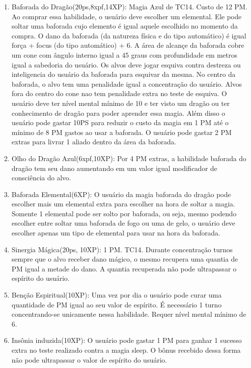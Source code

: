 \begin{enumerate}
	\item Baforada do Dragão(20ps,8xpf,14XP): Magia Azul de TC14. Custo de 12 PM.\newline
	Ao comprar essa habilidade, o usuário deve escolher um elemental. Ele pode soltar uma baforada cujo elemento é igual aquele escolhido no momento da compra. O dano da baforada (da natureza física e do tipo automático) é igual força + focus (do tipo automático) + 6. A área de alcançe da baforada cobre um cone com ângulo interno igual a 45 graus com profundidade em metros igual a sabedoria do usuário. 
	Os alvos deve jogar esquiva contra destreza ou inteligencia do usuário da baforada para esquivar da mesma.
	No centro da baforada, o alvo tem uma penalidade igual a concentração do usuário. Alvos fora do centro do cone nao tem penalidade extra no teste de esquiva. 
	O usuário deve ter nível mental mínimo de 10 e ter visto um dragão ou ter conhecimento de dragão para poder aprender essa magia. Além disso o usuário pode gastar 10PS para reduzir o custo da magia em 1 PM até o mínimo de 8 PM gastos ao usar a baforada. O usuário pode gastar 2 PM extras para livrar 1 aliado dentro da área da baforada.
	
	\item Olho do Dragão Azul(6xpf,10XP): Por 4 PM extras, a habilidade baforada do dragão tem seu dano aumentando em um valor igual modificador de consciência do alvo.
	
	\item Baforada Elemental(6XP): O usuário da magia baforada do dragão pode escolher mais um elemental extra para escolher na hora de soltar a magia. Somente 1 elemental pode ser solto por baforada, ou seja, mesmo podendo escolher entre soltar uma baforada de fogo ou uma de gelo, o usuário deve escolher apenas um tipo de elemental para usar na hora da baforada.

	\item Sinergia Mágica(20ps, 10XP): 1 PM. TC14. \newline
Durante concentração turnos sempre que o alvo receber dano mágico, o mesmo recupera uma quantia de PM igual a metade do dano. A quantia recuperada não pode ultrapassar o espírito do usuário.

	\item Benção Espiritual(10XP): Uma vez por dia o usuário pode curar uma quantidade de PM igual ao seu valor de espírito. É necessário 1 turno concentrando-se unicamente nessa habilidade. Requer nível mental mínimo de 6.

	\item Insônia induzida(10XP): O usuário pode gastar 1 PM para ganhar 1 sucesso extra no teste realizado contra a magia sleep. O bônus recebido dessa forma não pode ultrapassar o valor de espírito do usuário.
	

\end{enumerate}
